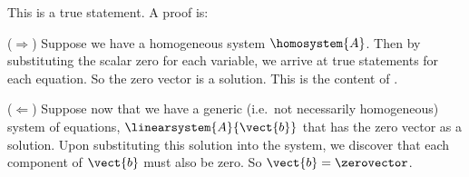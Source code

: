 This is a true statement.  A proof is:\par
%
($\Rightarrow$)  Suppose we have a homogeneous system $\homosystem{A}$.  Then by substituting the scalar zero for each variable, we arrive at true statements for each equation.  So the zero vector is a solution.  This is the content of .\par
%
($\Leftarrow$)  Suppose now that we have a generic (i.e.\ not necessarily homogeneous) system of equations, $\linearsystem{A}{\vect{b}}$ that has the zero vector as a solution.  Upon substituting this solution into the system, we discover that each component of $\vect{b}$ must also be zero.  So $\vect{b}=\zerovector$.
